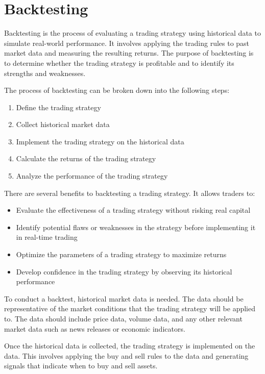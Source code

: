 \section{Backtesting}

Backtesting is the process of evaluating a trading strategy using historical data to simulate real-world performance. It involves applying the trading rules to past market data and measuring the resulting returns. The purpose of backtesting is to determine whether the trading strategy is profitable and to identify its strengths and weaknesses.

The process of backtesting can be broken down into the following steps:

\begin{enumerate}
\item Define the trading strategy
\item Collect historical market data
\item Implement the trading strategy on the historical data
\item Calculate the returns of the trading strategy
\item Analyze the performance of the trading strategy
\end{enumerate}

There are several benefits to backtesting a trading strategy. It allows traders to:

\begin{itemize}
\item Evaluate the effectiveness of a trading strategy without risking real capital
\item Identify potential flaws or weaknesses in the strategy before implementing it in real-time trading
\item Optimize the parameters of a trading strategy to maximize returns
\item Develop confidence in the trading strategy by observing its historical performance
\end{itemize}

To conduct a backtest, historical market data is needed. The data should be representative of the market conditions that the trading strategy will be applied to. The data should include price data, volume data, and any other relevant market data such as news releases or economic indicators.

Once the historical data is collected, the trading strategy is implemented on the data. This involves applying the buy and sell rules to the data and generating signals that indicate when to buy and sell assets.

